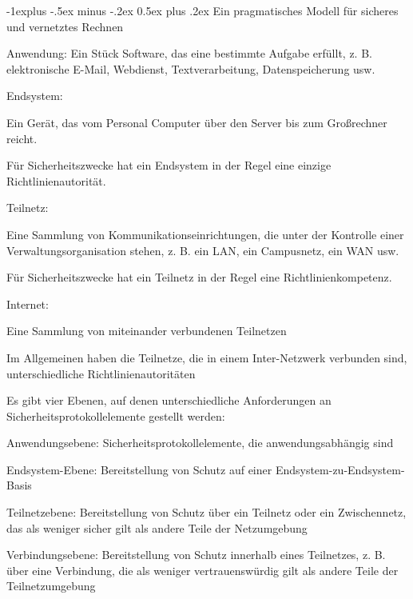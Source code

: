 \documentclass[a4paper]{article}
\makeatletter
\renewcommand{\subsection}{\@startsection{subsection}{2}{0mm}%
 {-1explus -.5ex minus -.2ex}%
 {0.5ex plus .2ex}%
 {\normalfont\normalsize\bfseries}}
\makeatother
\begin{document}
\begin{multicols}{3}
      \subsection{Ein pragmatisches Modell für sicheres und vernetztes Rechnen}
      \begin{itemize*}
            \item Anwendung: Ein Stück Software, das eine bestimmte Aufgabe erfüllt, z. B. elektronische E-Mail, Webdienst, Textverarbeitung, Datenspeicherung usw.
            \item Endsystem:
            \begin{itemize*}
                  \item Ein Gerät, das vom Personal Computer über den Server bis zum Großrechner reicht.
                  \item Für Sicherheitszwecke hat ein Endsystem in der Regel eine einzige Richtlinienautorität.
            \end{itemize*}
            \item Teilnetz:
            \begin{itemize*}
                  \item Eine Sammlung von Kommunikationseinrichtungen, die unter der Kontrolle einer Verwaltungsorganisation stehen, z. B. ein LAN, ein Campusnetz, ein WAN usw.
                  \item Für Sicherheitszwecke hat ein Teilnetz in der Regel eine Richtlinienkompetenz.
            \end{itemize*}
            \item Internet:
            \begin{itemize*}
                  \item Eine Sammlung von miteinander verbundenen Teilnetzen
                  \item Im Allgemeinen haben die Teilnetze, die in einem Inter-Netzwerk verbunden sind, unterschiedliche Richtlinienautoritäten
            \end{itemize*}
            \item Es gibt vier Ebenen, auf denen unterschiedliche Anforderungen an Sicherheitsprotokollelemente gestellt werden:
            \begin{itemize*}
                  \item Anwendungsebene: Sicherheitsprotokollelemente, die anwendungsabhängig sind
                  \item Endsystem-Ebene: Bereitstellung von Schutz auf einer Endsystem-zu-Endsystem-Basis
                  \item Teilnetzebene: Bereitstellung von Schutz über ein Teilnetz oder ein Zwischennetz, das als weniger sicher gilt als andere Teile der Netzumgebung
                  \item Verbindungsebene: Bereitstellung von Schutz innerhalb eines Teilnetzes, z. B. über eine Verbindung, die als weniger vertrauenswürdig gilt als andere Teile der Teilnetzumgebung
            \end{itemize*}
      \end{itemize*}


\end{multicols}
\end{document}

